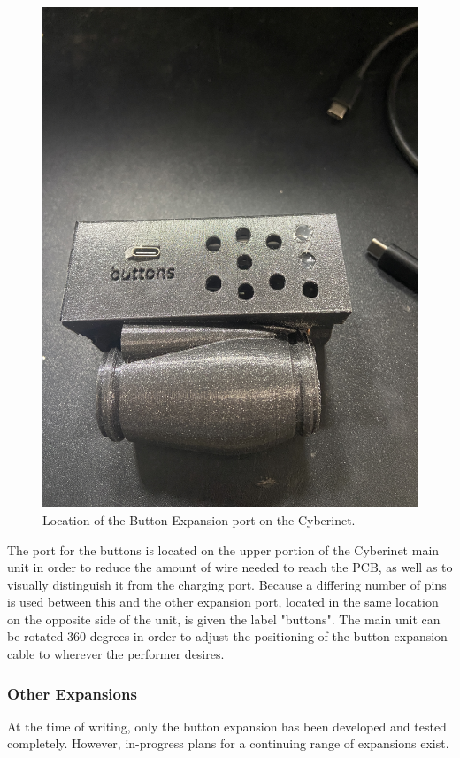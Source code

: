 \begin{figure} %
    \centering 
    \includegraphics[scale=0.05, angle=270]{diagrams/builtUnits/buttonPort.JPG}
    \caption{Location of the Button Expansion port on the Cyberinet.}
    \label{fig:buttonPort}
\end{figure}

The port for the buttons is located on the upper portion of the Cyberinet main unit in order to reduce the amount of wire needed to reach the PCB, as well as to visually distinguish it from the charging port. Because a differing number of pins is used between this and the other expansion port, located in the same location on the opposite side of the unit, is given the label "buttons". The main unit can be rotated 360 degrees in order to adjust the positioning of the button expansion cable to wherever the performer desires.

\subsubsection{Other Expansions}
At the time of writing, only the button expansion has been developed and tested completely. However, in-progress plans for a continuing range of expansions exist.

